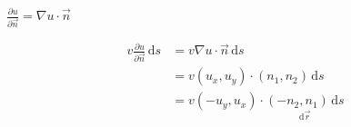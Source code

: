 $\frac{\partial u}{\partial\overrightarrow{n}}=\nabla u\cdot\overrightarrow{n}$

\begin{align*}
    v\frac{\partial u}{\partial\overrightarrow{n}}\,\mathrm{d}s
     & =v\nabla u\cdot\overrightarrow{n}\,\mathrm{d}s                                            \\
     & =v(u_x,u_y)\cdot(n_1,n_2)\,\mathrm{d}s                                                    \\
     & =v(-u_y,u_x)\cdot\underset{\mathrm{d}\overrightarrow{r}}{\boxed{(-n_2,n_1)\,\mathrm{d}s}} \\
\end{align*}

